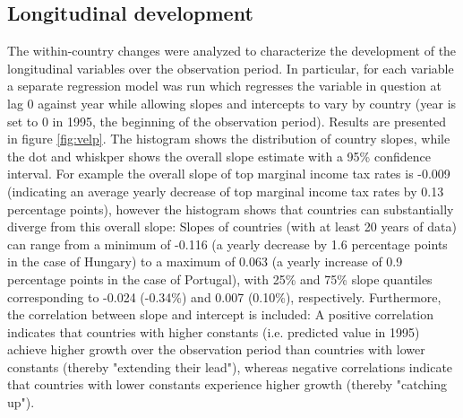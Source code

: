 \documentclass[11pt]{article}
\begin{document}
\subsection{Longitudinal development}
\label{app_velp}
The within-country changes were analyzed to characterize the development of the longitudinal variables over the observation period.
In particular, for each variable a separate regression model was run which regresses the variable in question at lag 0 against year while allowing slopes and intercepts to vary by country (year is set to 0 in 1995, the beginning of the observation period).
Results are presented in figure \ref{fig:velp}.
The histogram shows the distribution of country slopes, while the dot and whiskper shows the overall slope estimate with a 95\% confidence interval.
For example the overall slope of top marginal income tax rates is -0.009 (indicating an average yearly decrease of top marginal income tax rates by 0.13 percentage points), however the histogram shows that countries can substantially diverge from this overall slope: 
Slopes of countries (with at least 20 years of data) can range from a minimum of -0.116 (a yearly decrease by 1.6 percentage points in the case of Hungary) to a maximum of 0.063 (a yearly increase of 0.9 percentage points in the case of Portugal), with 25\% and 75\% slope quantiles corresponding to -0.024 (-0.34\%) and 0.007 (0.10\%), respectively.
Furthermore, the correlation between slope and intercept is included:
A positive correlation indicates that countries with higher constants (i.e. predicted value in 1995) achieve higher growth over the observation period than countries with lower constants (thereby "extending their lead"), whereas negative correlations indicate that countries with lower constants experience higher growth (thereby "catching up").
\end{document}
